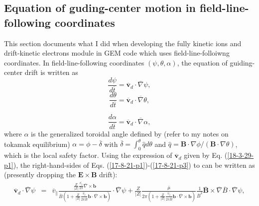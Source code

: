 \documentclass{article}
\begin{document}
\subsection{Equation of guding-center motion in field-line-following
coordinates}

This section documents what I did when developing the fully kinetic ions and
drift-kinetic electrons module in GEM code which uses field-line-folloiwng
coordinates. In field-line-following coordinates $(\psi, \theta, \alpha)$, the
equation of guiding-center drift is written as
\begin{equation}
  \label{17-8-21-p1} \frac{d \psi}{d \overline{t}} = \overline{\mathbf{v}}_d
  \cdot \overline{\nabla} \psi,
\end{equation}
\begin{equation}
  \label{17-8-21-p2} \frac{d \theta}{d \overline{t}} = \overline{\mathbf{v}}_d
  \cdot \overline{\nabla} \theta,
\end{equation}

\begin{equation}
  \label{17-8-21-p3} \frac{d \alpha}{d \overline{t}} = \overline{\mathbf{v}}_d
  \cdot \overline{\nabla} \alpha,
\end{equation}
where $\alpha$ is the generalized toroidal angle defined by (refer to my notes
on tokamak equilibrium) $\alpha = \phi - \overline{\delta}$ with
$\overline{\delta} = \int_0^{\theta} \hat{q} d \theta$ and $\hat{q}
=\mathbf{B} \cdot \nabla \phi / (\mathbf{B} \cdot \nabla \theta)$, which is
the local safety factor. Using the expression of $\overline{\mathbf{v}}_d$
given by Eq. (\ref{18-3-29-p1}), the right-hand-sides of Eqs.
(\ref{17-8-21-p1})-(\ref{17-8-21-p3}) to can be written as (presently dropping
the $\mathbf{E} \times \mathbf{B}$ drift):
\begin{eqnarray}
  \overline{\mathbf{v}}_d \cdot \overline{\nabla} \psi & = &
  \overline{v}_{\parallel} \frac{\frac{Z}{| Z |}
  \frac{\overline{v_{\parallel}}}{2 \pi} \overline{\nabla} \times
  \mathbf{b}}{\overline{B} \left( 1 + \frac{Z}{| Z |}
  \frac{\overline{v}_{\parallel}}{2 \pi \overline{B}} \mathbf{b} \cdot
  \overline{\nabla} \times \mathbf{b} \right)} \cdot \overline{\nabla} \psi +
  \frac{Z}{| Z |}  \frac{\overline{\mu}}{2 \pi \left( 1 + \frac{Z}{| Z |} 
  \frac{\overline{v}_{\parallel}}{2 \pi \overline{B}} \mathbf{b} \cdot
  \overline{\nabla} \times \mathbf{b} \right)} \frac{1}{\overline{B}^2}
  \overline{\mathbf{B}} \times \overline{\nabla} \overline{B} \cdot
  \overline{\nabla} \psi, 
\end{eqnarray}
\end{document}
